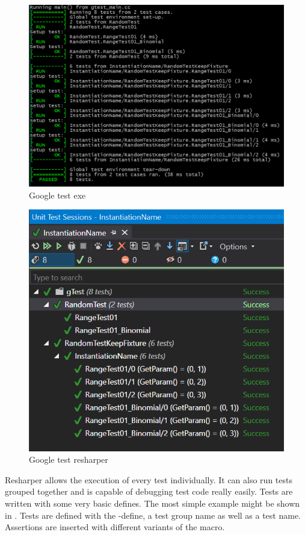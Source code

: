     \begin{figure}[hbtp]
        \centering
        \includegraphics[width=\columnwidth]{img/gtestExe.PNG}
        \caption{Google test exe}
        \label{fig:gtestExe}
    \end{figure}
    \begin{figure}[hbtp]
        \centering
        \includegraphics[width=0.8\columnwidth]{img/gTestResharper.PNG}
        \caption{Google test resharper}
        \label{fig:gtestResharper}
    \end{figure}

    Resharper allows the execution of every test individually. It can also run tests grouped together and is capable of debugging  test code really easily.
    Tests are written with some very basic defines. The most simple example might be shown in .
    Tests are defined with the -define, a test group name as well as a test name. Assertions are inserted with different variants of the  macro. 
    

